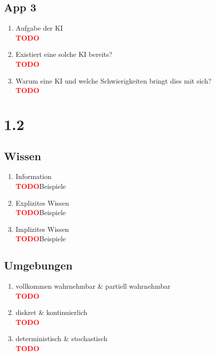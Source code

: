 \documentclass[a4paper,11pt,fleqn]{scrartcl}
\newcommand{\todo}{\textcolor{red}{\textbf{TODO}}}
\begin{document}
\subsection*{App 3}
\begin{enumerate}
	\item Aufgabe der KI \\
	\todo
	\item Existiert eine solche KI bereits? \\
	\todo
	\item Warum eine KI und welche Schwierigkeiten bringt dies mit sich? \\
	\todo 
\end{enumerate}

\section*{1.2}
\subsection*{Wissen}
\begin{enumerate}
	\item Information \\
	\todo Beispiele
	\item Explizites Wissen \\
	\todo Beispiele
	\item Implizites Wissen\\
	\todo Beispiele
\end{enumerate}

\subsection*{Umgebungen}
\begin{enumerate}
	\item vollkommen wahrnehmbar \& partiell wahrnehmbar \\
	\todo
	\item diskret \& kontinuierlich \\
	\todo
	\item deterministisch \& stochastisch \\
	\todo
\end{enumerate}
\end{document}
